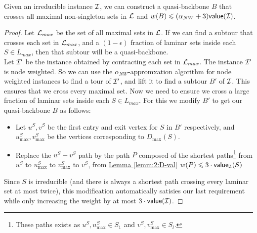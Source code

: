 \documentclass[./main.tex]{subfiles}
\begin{document}
	\begin{lemma}\label{lemm:6:q-bb}
		Given an irreducible instance $\mathcal{I}$, we can construct a quasi-backbone $B$ that crosses all maximal non-singleton sets in $\mathcal{L}$ and $w(B) \leqslant (\alpha_{NW} + 3)\textsf{\textup{value}}(\mathcal{I})$.
	\end{lemma}
	\begin{proof}
		Let $\mathcal{L}_{max}$ be the set of all maximal sets in $\mathcal{L}$. If we can find a subtour that crosses each set in $\mathcal{L}_{max}$, and a $(1-\epsilon)$ fraction of laminar sets inside each $S\in L_{max}$, then that subtour will be a quasi-backbone.\vspace{2mm}
		\\Let $\mathcal{I}'$ be the instance obtained by contracting each set in $\mathcal{L}_{max}$. The instance $\mathcal{I}'$ is node weighted. So we can use the $\alpha_{NW}$-appromxation algorithm for node weighted instances to find a tour of $\mathcal{I}'$, and lift it to find a subtour $B'$ of $\mathcal{I}$. This ensures that we cross every maximal set. Now we need to ensure we cross a large fraction of laminar sets inside each $S\in L_{max}$.
		For this we modify $B'$ to get our quasi-backbone $B$ as follows:
		\begin{itemize}[-]
			\item Let $u^S, v^S$ be the first entry and exit vertex for $S$ in $B'$ respectively, and $u^S_{\max}, v^S_{\max}$ be the vertices corresponding to $D_{\max}(S)$.
			\item Replace the $u^S - v^S$ path by the path $P$ composed of the shortest paths\footnote{These paths exists as $u^S, u^S_{\max} \in S_1$ and $v^S, v^S_{\max} \in S_l$.} from $u^S$ to $u^S_{\max}$ to $v^S_{\max}$ to $v^S$, from \hyperref[lemm:2:D-val]{Lemma \ref{lemm:2:D-val}} $w(P) \leqslant 3\cdot\textsf{\textup{value}}_{\mathcal{I}}(S)$
		\end{itemize}
		Since $S$ is irreducible (and there is always a shortest path crossing every laminar set at most twice), this modification automatically satisies our last requirement while only increasing the weight by at most $3\cdot\textsf{\textup{value}}(\mathcal{I})$.
	\end{proof}
\end{document}
